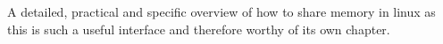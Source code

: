 A detailed, practical and specific overview of how to share memory in linux as
this is such a useful interface and therefore worthy of its own chapter.\\
